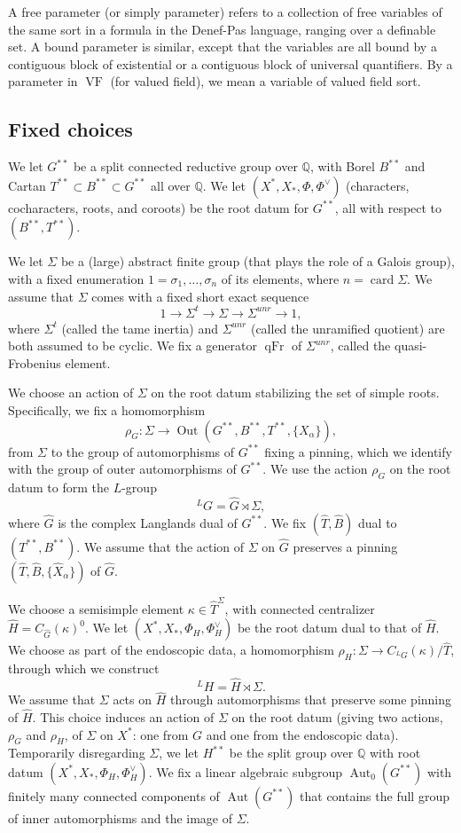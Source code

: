 \documentclass[12pt]{amsart}
\newcommand{\op}[1]{\operatorname{#1}}
\newcommand{\ring}[1]{{\mathbb #1}}
\def\VF{{\op{VF}}}
\theoremstyle{plain}
\theoremstyle{definition}
\begin{document}
A free parameter (or simply parameter) refers to a collection of free
variables of the same sort in a formula in the Denef-Pas language,
ranging over a definable set.  A bound parameter is similar, except
that the variables are all bound by a contiguous block of existential
or a contiguous block of universal quantifiers.  By a parameter in
$\VF$ (for valued field), we mean a variable of valued field sort.


\subsection{Fixed choices}\label{sec:fixed}

We let $G^{**}$ be a split connected reductive group over $\ring{Q}$,
with Borel $B^{**}$ and Cartan $T^{**}\subset B^{**} \subset G^{**}$
all over $\ring{Q}$.  We let $(X^*,X_*,\Phi,\Phi^\vee)$ (characters,
cocharacters, roots, and coroots) be the root
datum for $G^{**}$,
all with respect to
$(B^{**},T^{**})$.  

We let $\Sigma$ be a (large) abstract finite group (that plays the
role of a Galois group), with a fixed enumeration
$1=\sigma_1,\ldots,\sigma_n$ of its elements, where $n =
\op{card}{\Sigma}$.
We assume that $\Sigma$ comes with a fixed short exact sequence
\[
1 \to \Sigma^t \to \Sigma \to \Sigma^{unr} \to 1,
\]
where $\Sigma^t$ (called the tame inertia) and $\Sigma^{unr}$ (called
the unramified quotient) are both assumed to be cyclic.  We fix a
generator $\op{qFr}$ of $\Sigma^{unr}$, called the quasi-Frobenius
element.


We choose an action of $\Sigma$ on the root datum stabilizing the set
of simple roots.  Specifically, we fix a homomorphism
\[
\rho_G:\Sigma\to \op{Out}(G^{**},B^{**},T^{**},\{X_\alpha\}),
\]
from $\Sigma$ to the group of automorphisms of $G^{**}$ fixing a
pinning, which we identify with the group of outer automorphisms of
$G^{**}$.  We use the action $\rho_G$ on the root datum to form the
$L$-group
\[
{}^LG = \hat G \rtimes \Sigma,
\]
where $\hat G$ is the complex Langlands dual of $G^{**}$.
We fix $(\hat T,\hat B)$ dual to $(T^{**},B^{**})$.    We assume
that the action of $\Sigma$ on $\hat G$ preserves a pinning
$(\hat T,\hat B,\{\hat X_\alpha\})$ of $\hat G$.  

We choose a semisimple element $\kappa\in \hat T^\Sigma$, with
connected centralizer $\hat H = C_{\hat G}(\kappa)^0$.  We let
$(X^*,X_*,\Phi_H,\Phi_H^\vee)$ be the root datum dual to that
of $\hat H$.  We choose as part of the endoscopic data,
a homomorphism $\rho_H:\Sigma \to C_{{}^LG}(\kappa)/\hat T$,
through which we construct
\[
{}^LH = \hat H \rtimes \Sigma.
\]
We assume that $\Sigma$ acts on $\hat H$ through automorphisms that
preserve some pinning of $\hat H$.  This choice induces an action of
$\Sigma$ on the root datum (giving two actions, $\rho_G$ and $\rho_H$,
of $\Sigma$ on $X^*$: one from $G$ and one from the endoscopic data).
Temporarily disregarding $\Sigma$, we let $H^{**}$ be the split group
over $\ring{Q}$ with root datum $(X^*,X_*,\Phi_H,\Phi_H^\vee)$.  We
fix a linear algebraic subgroup $\op{Aut}_0(G^{**})$ with finitely many
connected components of $\op{Aut}(G^{**})$ that contains the full
group of inner automorphisms and the image of $\Sigma$.
\end{document}
